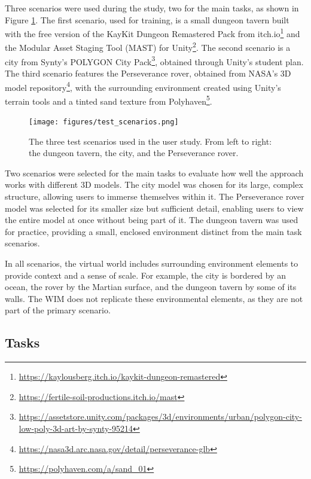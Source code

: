         Three scenarios were used during the study, two for the main tasks, as shown in Figure \ref{fig:test_scenarios}. The first scenario, used for training, is a small dungeon tavern built with the free version of the KayKit Dungeon Remastered Pack from itch.io\footnote{\url{https://kaylousberg.itch.io/kaykit-dungeon-remastered}} and the Modular Asset Staging Tool (MAST) for Unity\footnote{\url{https://fertile-soil-productions.itch.io/mast}}. The second scenario is a city from Synty's POLYGON City Pack\footnote{\url{https://assetstore.unity.com/packages/3d/environments/urban/polygon-city-low-poly-3d-art-by-synty-95214}}, obtained through Unity's student plan. The third scenario features the Perseverance rover, obtained from NASA's 3D model repository\footnote{\url{https://nasa3d.arc.nasa.gov/detail/perseverance-glb}}, with the surrounding environment created using Unity's terrain tools and a tinted sand texture from Polyhaven\footnote{\url{https://polyhaven.com/a/sand_01}}.

        \begin{figure}[h]
            \centering
            \texttt{[image: figures/test\_scenarios.png]}
            \caption{The three test scenarios used in the user study. From left to right: the dungeon tavern, the city, and the Perseverance rover.}
            \label{fig:test_scenarios}
        \end{figure}

        Two scenarios were selected for the main tasks to evaluate how well the approach works with different 3D models. The city model was chosen for its large, complex structure, allowing users to immerse themselves within it. The Perseverance rover model was selected for its smaller size but sufficient detail, enabling users to view the entire model at once without being part of it. The dungeon tavern was used for practice, providing a small, enclosed environment distinct from the main task scenarios.

        In all scenarios, the virtual world includes surrounding environment elements to provide context and a sense of scale. For example, the city is bordered by an ocean, the rover by the Martian surface, and the dungeon tavern by some of its walls. The WIM does not replicate these environmental elements, as they are not part of the primary scenario.

    \subsection{Tasks} \label{sec:tasks}

